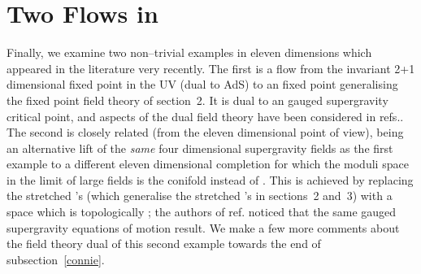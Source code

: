 \documentclass[a4paper,12pt]{article}
\begin{document}
\section{Two \coordHE{} Flows in \coordHE{}}
\label{M2sec}

Finally, we examine two non--trivial examples in eleven dimensions
which appeared in the literature very recently\cite{newwarner}. The
first is a flow from the \coordHE{} invariant 2+1 dimensional fixed point
in the UV (dual to AdS\coordHE{}) to an \coordHE{} fixed
point generalising the fixed point \coordHE{} field theory of section~2. It
is dual to an \coordHE{} gauged supergravity critical
point\cite{nicolai}, and aspects of the dual field theory have been
considered in refs.\cite{ahn}. The second is closely related (from the
eleven dimensional point of view), being an alternative lift of the
{\it same} four dimensional \coordHE{} supergravity fields as the
first example to a different eleven dimensional completion for which
the moduli space in the limit of large fields is the conifold instead
of \coordHE{}. This is achieved by replacing the stretched \coordHE{}'s (which
generalise the stretched \coordHE{}'s in sections~2 and~3) with a space
which is topologically \coordHE{}; the authors of ref.\cite{newwarner}
noticed that the same gauged supergravity equations of motion result.
We make a few more comments about the field theory dual of this second
example towards the end of subsection~\ref{connie}.
\end{document}
